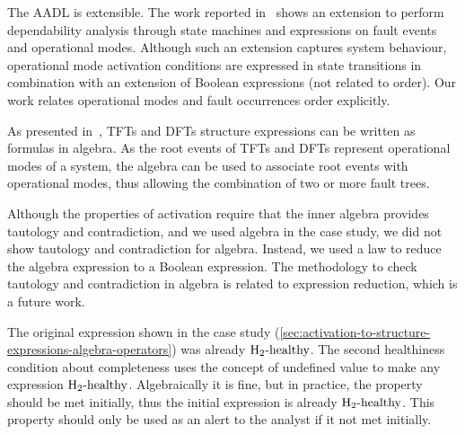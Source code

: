 
The \ac{AADL} is extensible. 
The work reported in~\cite{SAEAS55061A} shows an extension to perform dependability analysis through state machines and expressions on fault events and operational modes.
Although such an extension captures system behaviour, operational mode activation conditions are expressed in state transitions in combination with an extension of Boolean expressions (not related to order).
Our work relates operational modes and fault occurrences order explicitly.

As presented in~\cite{DM2016}, \acp{TFT} and \acp{DFT} structure expressions can be written as formulas in \ac{algebra}.
As the root events of \acp{TFT} and \acp{DFT} represent operational modes of a system, the \ac{algebra} can be used to associate root events with operational modes, thus allowing the combination of two or more fault trees.

Although the properties of \ac{activation} require that the inner algebra provides tautology and contradiction, and we used \ac{algebra} in the case study, we did not show tautology and contradiction for \ac{algebra}. 
Instead, we used a law to reduce the \ac{algebra} expression to a Boolean expression.
The methodology to check tautology and contradiction in \ac{algebra} is related to expression reduction, which is a future work.

The original expression shown in the case study (\cref{sec:activation-to-structure-expressions-algebra-operators}) was already $\healthy[2]$.
The second healthiness condition about completeness uses the concept of undefined value to make any expression $\healthy[2]$.
Algebraically it is fine, but in practice, the property should be met initially, thus the initial expression is already $\healthy[2]$.
This property should only be used as an alert to the analyst if it not met initially.




